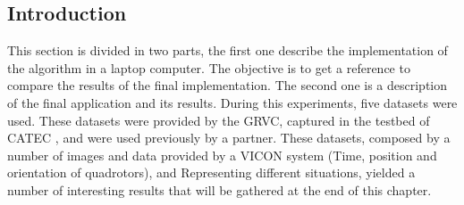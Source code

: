 \subsection{Introduction}
	This section is divided in two parts, the first one describe the implementation of the algorithm in a laptop computer. The objective is to get a reference to compare the results of the final implementation. The second one is a description of the final application and its results.
	During this experiments, five datasets were used. These datasets were provided by the GRVC, captured in the testbed of CATEC \cite{CATEC}, and were used previously by a partner. These datasets, composed by a number of images and data provided by a VICON system (Time, position and orientation of quadrotors), and Representing different situations, yielded a number of interesting results that will be gathered at the end of this chapter. 

